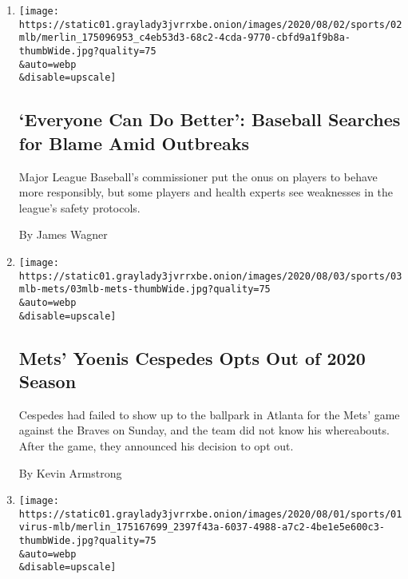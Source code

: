 \begin{enumerate}
\def\labelenumi{\arabic{enumi}.}
\item
  \href{/2020/08/02/sports/baseball/mlb-coronavirus-outbreaks.html}{}

  \texttt{[image: https://static01.graylady3jvrrxbe.onion/images/2020/08/02/sports/02mlb/merlin\_175096953\_c4eb53d3-68c2-4cda-9770-cbfd9a1f9b8a-thumbWide.jpg?quality=75\\\&auto=webp\\\&disable=upscale]}

  \hypertarget{everyone-can-do-better-baseball-searches-for-blame-amid-outbreaks}{%
  \subsection{`Everyone Can Do Better': Baseball Searches for Blame Amid
  Outbreaks}\label{everyone-can-do-better-baseball-searches-for-blame-amid-outbreaks}}

  Major League Baseball's commissioner put the onus on players to behave
  more responsibly, but some players and health experts see weaknesses
  in the league's safety protocols.

  By James Wagner
\item
  \href{/2020/08/02/sports/baseball/Yoenis-cespedes-opt-out-rule.html}{}

  \texttt{[image: https://static01.graylady3jvrrxbe.onion/images/2020/08/03/sports/03mlb-mets/03mlb-mets-thumbWide.jpg?quality=75\\\&auto=webp\\\&disable=upscale]}

  \hypertarget{mets-yoenis-cespedes-opts-out-of-2020-season}{%
  \subsection{Mets' Yoenis Cespedes Opts Out of 2020
  Season}\label{mets-yoenis-cespedes-opts-out-of-2020-season}}

  Cespedes had failed to show up to the ballpark in Atlanta for the
  Mets' game against the Braves on Sunday, and the team did not know his
  whereabouts. After the game, they announced his decision to opt out.

  By Kevin Armstrong
\item
  \href{/2020/08/01/sports/baseball/coronavirus-cardinals.html}{}

  \texttt{[image: https://static01.graylady3jvrrxbe.onion/images/2020/08/01/sports/01virus-mlb/merlin\_175167699\_2397f43a-6037-4988-a7c2-4be1e5e600c3-thumbWide.jpg?quality=75\\\&auto=webp\\\&disable=upscale]}

  \hypertarget{more-games-postponed-with-4-more-coronavirus-cases-for-cardinals}{%
}
\end{enumerate}
